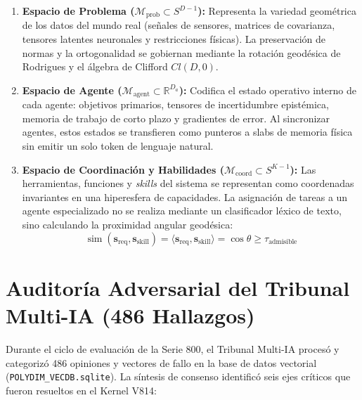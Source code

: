 \begin{enumerate}
    \item \textbf{Espacio de Problema ($\mathcal{M}_{\text{prob}} \subset S^{D-1}$):}
    Representa la variedad geométrica de los datos del mundo real (señales de sensores, matrices de covarianza, tensores latentes neuronales y restricciones físicas). La preservación de normas y la ortogonalidad se gobiernan mediante la rotación geodésica de Rodrigues y el álgebra de Clifford $Cl(D, 0)$.
    
    \item \textbf{Espacio de Agente ($\mathcal{M}_{\text{agent}} \subset \mathbb{R}^{D_a}$):}
    Codifica el estado operativo interno de cada agente: objetivos primarios, tensores de incertidumbre epistémica, memoria de trabajo de corto plazo y gradientes de error. Al sincronizar agentes, estos estados se transfieren como punteros a slabs de memoria física sin emitir un solo token de lenguaje natural.
    
    \item \textbf{Espacio de Coordinación y Habilidades ($\mathcal{M}_{\text{coord}} \subset S^{K-1}$):}
    Las herramientas, funciones y \textit{skills} del sistema se representan como coordenadas invariantes en una hiperesfera de capacidades. La asignación de tareas a un agente especializado no se realiza mediante un clasificador léxico de texto, sino calculando la proximidad angular geodésica:
    \begin{equation}
    \operatorname{sim}(\mathbf{s}_{\text{req}}, \mathbf{s}_{\text{skill}}) = \langle \mathbf{s}_{\text{req}}, \mathbf{s}_{\text{skill}} \rangle = \cos \theta \ge \tau_{\text{admisible}}
    \end{equation}
\end{enumerate}

\section{Auditoría Adversarial del Tribunal Multi-IA (486 Hallazgos)}

Durante el ciclo de evaluación de la Serie 800, el Tribunal Multi-IA procesó y categorizó 486 opiniones y vectores de fallo en la base de datos vectorial (\texttt{POLYDIM\_VECDB.sqlite}). La síntesis de consenso identificó seis ejes críticos que fueron resueltos en el Kernel V814:


